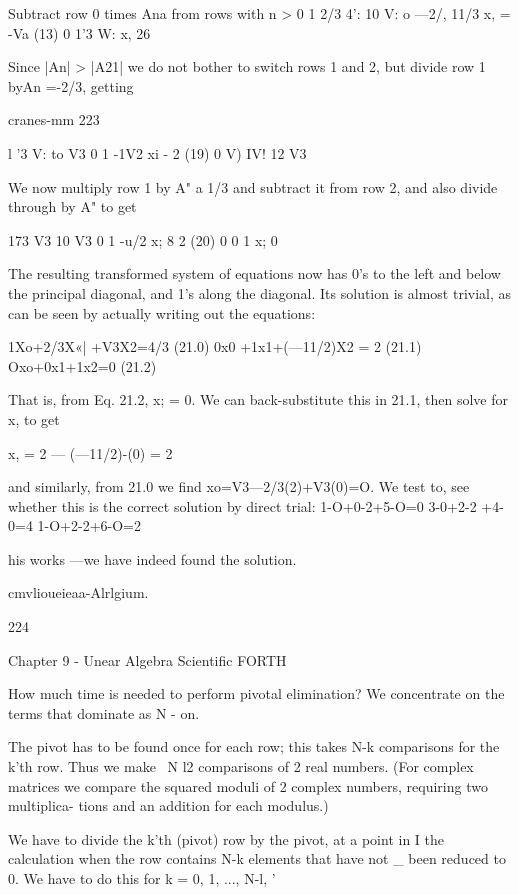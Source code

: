 {Subtract row 0 times Ana from rows with n > 0
1 2/3 4': 10 V:
o —2/, 11/3 x, = -Va (13)
0 1'3 W: x, 26

 

Since |An| > |A21| we do not bother to switch rows 1 and 2, but
divide row 1 byAn =-2/3, getting

cranes-mm 223

l '3 V: to V3
0 1 -1V2 xi - 2 (19)
0 V) IV! 12 V3

 

 

 

 

We now multiply row 1 by A" a 1/3 and subtract it from row 2,
and also divide through by A" to get

173 V3 10 V3
0 1 -u/2 x; 8 2 (20)
0 0 1 x; 0

 

The resulting transformed system of equations now has 0's to the
left and below the principal diagonal, and 1's along the diagonal.
Its solution is almost trivial, as can be seen by actually writing out
the equations:

1Xo+2/3X«| +V3X2=4/3 (21.0)
0x0 +1x1+(—11/2)X2 = 2 (21.1)
Oxo+0x1+1x2=0 (21.2)

That is, from Eq. 21.2, x; = 0. We can back-substitute this in 21.1,
then solve for x, to get

x, = 2 — (—11/2)-(0) = 2

and similarly, from 21.0 we ﬁnd
xo=V3—2/3(2)+V3(0)=O.
We test to, see whether this is the correct solution by direct trial:
1-O+0-2+5-O=0
3-0+2-2 +4-0=4
1-O+2-2+6-O=2

his works —we have indeed found the solution.

cmvlioueieaa-Alrlgium.

224

Chapter 9 - Unear Algebra Scientiﬁc FORTH

How much time is needed to perform pivotal elimination? We
concentrate on the terms that dominate as N - on.

The pivot has to be found once for each row; this takes N-k
comparisons for the k'th row. Thus we make ~N l2 comparisons
of 2 real numbers. (For complex matrices we compare the
squared moduli of 2 complex numbers, requiring two multiplica-
tions and an addition for each modulus.)

We have to divide the k'th (pivot) row by the pivot, at a point in I
the calculation when the row contains N-k elements that have not \_
been reduced to 0. We have to do this for k = 0, 1, ..., N-l, '

}
